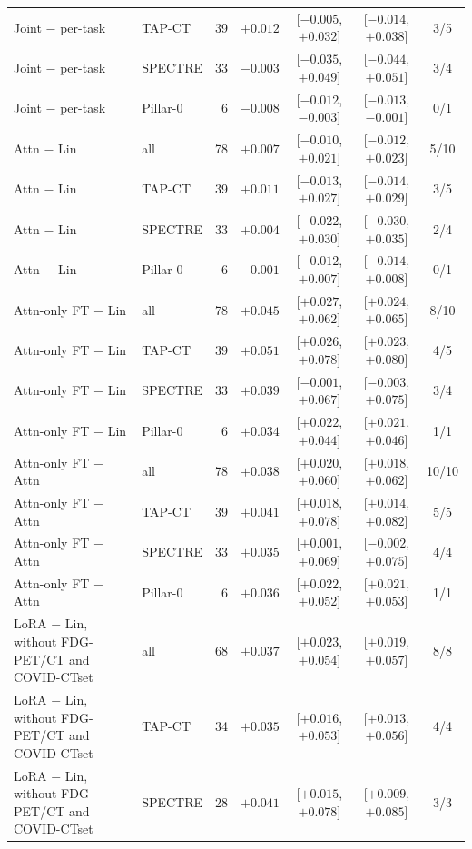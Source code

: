 \begin{tabular}{llrrccc}
Joint $-$ per-task & TAP-CT & 39 & $+0.012$ & [$-0.005$, $+0.032$] & [$-0.014$, $+0.038$] & 3/5 \\
Joint $-$ per-task & SPECTRE & 33 & $-0.003$ & [$-0.035$, $+0.049$] & [$-0.044$, $+0.051$] & 3/4 \\
Joint $-$ per-task & Pillar-0 & 6 & $-0.008$ & [$-0.012$, $-0.003$] & [$-0.013$, $-0.001$] & 0/1 \\
\addlinespace[2pt]
Attn $-$ Lin & all & 78 & $+0.007$ & [$-0.010$, $+0.021$] & [$-0.012$, $+0.023$] & 5/10 \\
Attn $-$ Lin & TAP-CT & 39 & $+0.011$ & [$-0.013$, $+0.027$] & [$-0.014$, $+0.029$] & 3/5 \\
Attn $-$ Lin & SPECTRE & 33 & $+0.004$ & [$-0.022$, $+0.030$] & [$-0.030$, $+0.035$] & 2/4 \\
Attn $-$ Lin & Pillar-0 & 6 & $-0.001$ & [$-0.012$, $+0.007$] & [$-0.014$, $+0.008$] & 0/1 \\
\addlinespace[2pt]
Attn-only FT $-$ Lin & all & 78 & $+0.045$ & [$+0.027$, $+0.062$] & [$+0.024$, $+0.065$] & 8/10 \\
Attn-only FT $-$ Lin & TAP-CT & 39 & $+0.051$ & [$+0.026$, $+0.078$] & [$+0.023$, $+0.080$] & 4/5 \\
Attn-only FT $-$ Lin & SPECTRE & 33 & $+0.039$ & [$-0.001$, $+0.067$] & [$-0.003$, $+0.075$] & 3/4 \\
Attn-only FT $-$ Lin & Pillar-0 & 6 & $+0.034$ & [$+0.022$, $+0.044$] & [$+0.021$, $+0.046$] & 1/1 \\
\addlinespace[2pt]
Attn-only FT $-$ Attn & all & 78 & $+0.038$ & [$+0.020$, $+0.060$] & [$+0.018$, $+0.062$] & 10/10 \\
Attn-only FT $-$ Attn & TAP-CT & 39 & $+0.041$ & [$+0.018$, $+0.078$] & [$+0.014$, $+0.082$] & 5/5 \\
Attn-only FT $-$ Attn & SPECTRE & 33 & $+0.035$ & [$+0.001$, $+0.069$] & [$-0.002$, $+0.075$] & 4/4 \\
Attn-only FT $-$ Attn & Pillar-0 & 6 & $+0.036$ & [$+0.022$, $+0.052$] & [$+0.021$, $+0.053$] & 1/1 \\
\addlinespace[2pt]
LoRA $-$ Lin, without FDG-PET/CT and COVID-CTset & all & 68 & $+0.037$ & [$+0.023$, $+0.054$] & [$+0.019$, $+0.057$] & 8/8 \\
LoRA $-$ Lin, without FDG-PET/CT and COVID-CTset & TAP-CT & 34 & $+0.035$ & [$+0.016$, $+0.053$] & [$+0.013$, $+0.056$] & 4/4 \\
LoRA $-$ Lin, without FDG-PET/CT and COVID-CTset & SPECTRE & 28 & $+0.041$ & [$+0.015$, $+0.078$] & [$+0.009$, $+0.085$] & 3/3 \\

\end{tabular}
